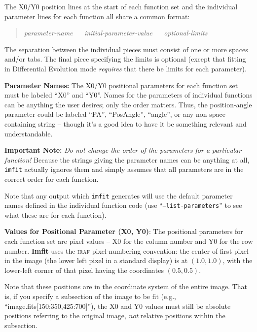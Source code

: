 \documentclass[10pt,a4paper,article]{memoir}
\newcommand{\Imfit}{\textbf{Imfit}}
\newcommand{\imfitprog}{\texttt{imfit}}
\begin{document}
The X0/Y0 position lines at the start of each function set and the
individual parameter lines for each function all share a common format:
\begin{quote}
\textit{parameter-name} ~~ \textit{initial-parameter-value} ~~ \textit{optional-limits}
\end{quote}
The separation between the individual pieces must consist of one or more spaces
and/or tabs. The final piece specifying the limits is optional (except that
fitting in Differential Evolution mode \textit{requires} that there be limits
for each parameter).

\bigskip

\textbf{Parameter Names:} The X0/Y0 positional parameters for each
function set must be labeled ``X0'' and ``Y0''. Names for the
parameters of individual functions can be anything the user desires;
only the order matters. Thus, the position-angle parameter could be
labeled ``PA'', ``PosAngle'', ``angle'', or any non-space-containing
string -- though it's a good idea to have it be something relevant
and understandable.

\textbf{Important Note:} \textit{Do not change the order of the parameters
for a particular function!}  Because the strings giving the parameter names
can be anything at all, \imfitprog{} actually ignores them and simply assumes
that all parameters are in the correct order for each function.

Note that any output which \imfitprog{} generates will use the default parameter
names defined in the individual function code (use ``\texttt{--list-parameters}''
to see what these are for each function).

\bigskip

\textbf{Values for Positional Parameter (X0, Y0)}: The positional parameters
for each function set are pixel values -- X0 for the column number and
Y0 for the row number. \Imfit{} uses the \textsc{iraf} pixel-numbering
convention: the center of first pixel in the image (the lower left pixel
in a standard display) is at $(1.0,1.0)$, with the lower-left corner of that
pixel having the coordinates $(0.5,0.5)$.

Note that these positions are in the coordinate system of the entire
image. That is, if you specify a subsection of the image to be fit
(e.g., ``image.fits[150:350,425:700]''), the X0 and Y0 values must still
be absolute positions referring to the original image, \textit{not} relative
positions within the subsection.


\bigskip
\end{document}
